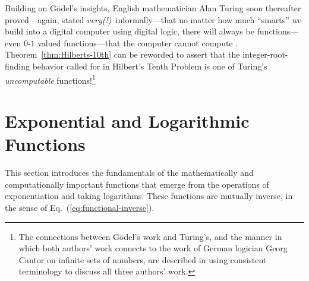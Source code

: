 \noindent {}

\bigskip

  

\noindent
Building on G\"{o}del's insights, English mathematician Alan Turing soon thereafter proved---again, stated {\em very(!)}~informally---that no matter how much ``smarts'' we build into a digital computer using digital logic, there will always be functions---even $0$-$1$ valued functions---that the computer cannot compute \cite{Turing36}.  Theorem~\ref{thm:Hilberts-10th} can be reworded to assert that the integer-root-finding behavior called for in Hilbert's Tenth Problem is one of Turing's {\it uncomputable} functions!\footnote{The connections between G\"{o}del's work and Turing's, and the manner in which both authors' work connects to the work of German logician Georg Cantor  on infinite sets of numbers, \cite{Cantor74,Cantor78} are described in \cite{Rosenberg09} using consistent terminology to discuss all three authors' work.}


\section{Exponential and Logarithmic Functions}
\label{sec:exponential+logarithm}

This section introduces the fundamentals of the mathematically and computationally important functions that emerge from the operations of exponentiation and taking logarithms.  These functions are mutually inverse, in the sense of Eq.~(\ref{eq:functional-inverse}).

